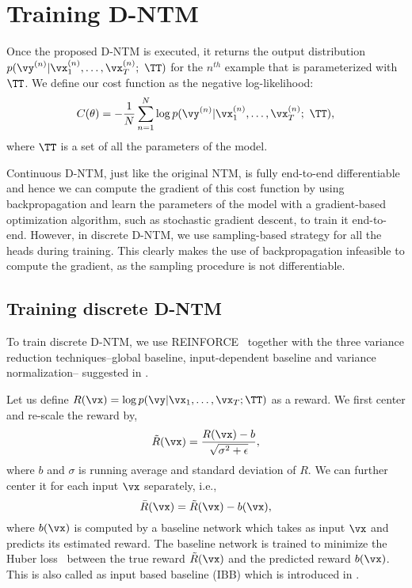 \documentclass[12pt]{article}
\begin{document}
\section{Training D-NTM}
Once the proposed D-NTM is executed, it returns the output distribution $p(\vy^{(n)}|\vx_1^{(n)}, \ldots, \vx_T^{(n)};~\TT)$ for the $n^{th}$ example that is parameterized with $\TT$. We define our cost function as the negative log-likelihood:
\begin{align}
    \label{eq:cost}
C(\theta) = -\frac{1}{N} \sum_{n=1}^N \log p(\vy^{(n)}|\vx_1^{(n)}, \ldots, \vx_T^{(n)};~\TT),
\end{align}
where $\TT$ is a set of all the parameters of the model. 

Continuous D-NTM, just like the original NTM, is fully end-to-end differentiable and hence we can compute the gradient of this cost function by using backpropagation and learn the parameters of the model with a gradient-based optimization algorithm, such as stochastic gradient descent, to train it end-to-end. However, in discrete D-NTM, we use sampling-based strategy for all the heads during training. This clearly makes the use of backpropagation infeasible to compute the gradient, as the sampling procedure is not differentiable. 


\subsection{Training discrete D-NTM}

To train discrete D-NTM, we use
REINFORCE~\citep{williams92} together with the three variance reduction
techniques--global baseline, input-dependent baseline and variance
normalization-- suggested in \citep{mnih2014neural}. 

Let us define $R(\vx)=\log p (\vy|\vx_1, \ldots, \vx_T; \TT)$ as a reward. We first center and re-scale the reward by,
\[
\tilde{R}(\vx) = \frac{R(\vx) - b}{\sqrt{\sigma^2 + \epsilon}},
\]
where $b$ and $\sigma$ is running average and standard deviation of $R$. We can further center it for each input $\vx$ separately, i.e., 
\[
\bar{R}(\vx) = \tilde{R}(\vx) - b(\vx),
\]
where $b(\vx)$ is computed by a baseline network which takes as input $\vx$ and predicts its estimated reward. The baseline network is trained to minimize the Huber loss~\citep{huber1964} between the true reward $\tilde{R}(\vx)$ and the predicted reward $b(\vx)$. This is also called as input based baseline (IBB) which is introduced in \citep{mnih2014neural}.
\end{document}
